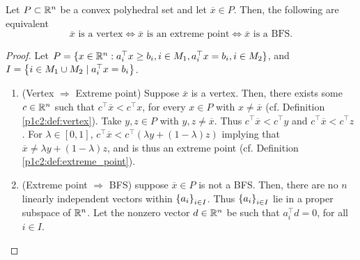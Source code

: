 \begin{theorem}\label{p1c2:thm:BFS_vertex_extreme_point}
	Let $P \subset \mathbb{R}^n$ be a convex polyhedral set and let $\overline{x} \in P$. Then, the following are equivalent
	$$	\overline{x} \text{ is a vertex} \iff \overline{x} \text{ is an extreme point} \iff \overline{x} \text{ is a BFS}.	
	$$
\end{theorem}


\begin{proof}
	Let $P =\{ x \in \mathbb{R}^n : a_i^\top x \geq b_i, i \in M_1, a_i^\top x = b_i, i \in M_2\}$, and $I = \left\{ i \in M_1 \cup M_2 \mid a_i^\top x = b_i \right \}$.
	
	\begin{enumerate}
		\item (Vertex $\Rightarrow$ Extreme point) Suppose $\overline{x}$ is a vertex. Then, there exists some $c \in \mathbb{R}^n$ such that $c^\top\overline{x} < c^\top x$, for every $x \in P$ with $x \neq \overline{x}$ (cf. Definition \ref{p1c2:def:vertex}). Take $y,z \in P$ with $y,z \neq \overline{x}$. Thus $c^\top\overline{x} < c^\top y$ and $c^\top\overline{x} < c^\top z$. For $\lambda \in [0,1]$, $c^\top \overline{x} < c^\top(\lambda y + (1-\lambda)z)$ implying that $\overline{x} \neq \lambda y + (1-\lambda)z$, and is thus an extreme point (cf. Definition \ref{p1c2:def:extreme_point}).
		
		\item (Extreme point $\Rightarrow$ BFS) suppose $\overline{x} \in P$ is not a BFS. Then, there are no $n$ linearly independent vectors within $\left\{ a_i \right \}_{i \in I}$. Thus $\left\{ a_i \right \}_{i \in I}$ lie in a proper subspace of $\mathbb{R}^n$. Let the nonzero vector $d \in \mathbb{R}^n$ be such that $a_i^\top d = 0$, for all $i \in I$.
			

\end{enumerate}
\end{proof}

